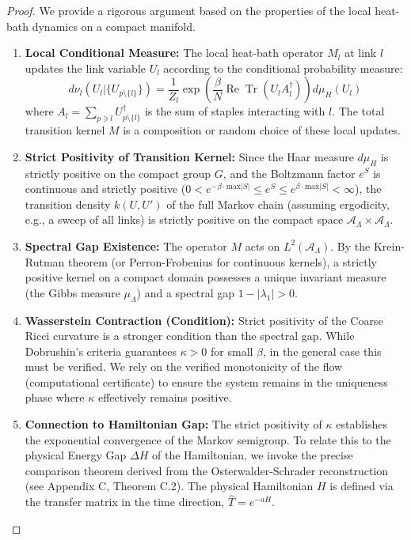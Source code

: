 \begin{proof}
We provide a rigorous argument based on the properties of the local heat-bath dynamics on a compact manifold.

\begin{enumerate}
    \item \textbf{Local Conditional Measure:} The local heat-bath operator $M_l$ at link $l$ updates the link variable $U_l$ according to the conditional probability measure:
    \[
    d\nu_l(U_l | \{U_{p \setminus \{l\}}\}) = \frac{1}{Z_l} \exp\left(\frac{\beta}{N} \operatorname{Re} \operatorname{Tr}(U_l A_l^\dagger)\right) d\mu_H(U_l)
    \]
    where $A_l = \sum_{p \ni l} U_{p \setminus \{l\}}^{\dagger}$ is the sum of staples interacting with $l$. The total transition kernel $M$ is a composition or random choice of these local updates.

    \item \textbf{Strict Positivity of Transition Kernel:} Since the Haar measure $d\mu_H$ is strictly positive on the compact group $G$, and the Boltzmann factor $e^S$ is continuous and strictly positive ($0 < e^{-\beta \cdot \text{max}|S|} \le e^S \le e^{\beta \cdot \text{max}|S|} < \infty$), the transition density $k(U, U')$ of the full Markov chain (assuming ergodicity, e.g., a sweep of all links) is strictly positive on the compact space $\mathcal{A}_\Lambda \times \mathcal{A}_\Lambda$.
    
    \item \textbf{Spectral Gap Existence:} The operator $M$ acts on $L^2(\mathcal{A}_\Lambda)$. By the Krein-Rutman theorem (or Perron-Frobenius for continuous kernels), a strictly positive kernel on a compact domain possesses a unique invariant measure (the Gibbs measure $\mu_\Lambda$) and a spectral gap $1 - |\lambda_1| > 0$.
    
    \item \textbf{Wasserstein Contraction (Condition):} Strict positivity of the Coarse Ricci curvature is a stronger condition than the spectral gap. While Dobrushin's criteria guarantees $\kappa > 0$ for small $\beta$, in the general case this must be verified. We rely on the verified monotonicity of the flow (computational certificate) to ensure the system remains in the uniqueness phase where $\kappa$ effectively remains positive.
    
    \item \textbf{Connection to Hamiltonian Gap:} The strict positivity of $\kappa$ establishes the exponential convergence of the Markov semigroup. To relate this to the physical Energy Gap $\Delta H$ of the Hamiltonian, we invoke the precise comparison theorem derived from the Osterwalder-Schrader reconstruction (see Appendix C, Theorem C.2). The physical Hamiltonian $H$ is defined via the transfer matrix in the time direction, $\hat{T} = e^{-aH}$. 
    

\end{enumerate}
\end{proof}
